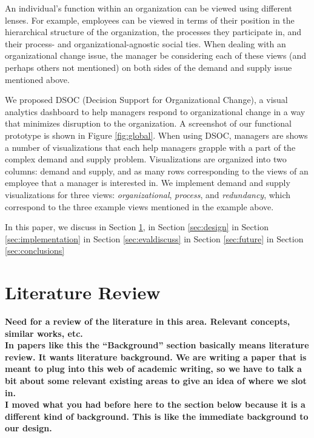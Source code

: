 \documentclass[journal]{vgtc}                %
\begin{document}
An individual's function within an organization can be viewed using different lenses. For example, employees can be viewed in terms of their position in the hierarchical structure of the organization, the processes they participate in, and their process- and organizational-agnostic social ties. When dealing with an organizational change issue, the manager be considering each of these views (and perhaps others not mentioned) on both sides of the demand and supply issue mentioned above.

We proposed DSOC (Decision Support for Organizational Change), a visual analytics dashboard to help managers respond to organizational change in a way that minimizes disruption to the organization. A screenshot of our functional prototype is shown in Figure \ref{fig:global}. When using DSOC, managers are shows a number of visualizations that each help managers grapple with a part of the complex demand and supply problem. Visualizations are organized into two columns: demand and supply, and as many rows corresponding to the views of an employee that a manager is interested in. We implement demand and supply visualizations for three views: \emph{organizational}, \emph{process}, and \emph{redundancy}, which correspond to the three example views mentioned in the example above. 

In this paper, we discuss \textellipsis in Section \ref{sec:background}, \textellipsis in Section \ref{sec:design} \textellipsis in Section \ref{sec:implementation} \textellipsis in Section \ref{sec:evaldiscuss} \textellipsis in Section \ref{sec:future} \textellipsis in Section \ref{sec:conclusions}


\section{Literature Review}
\label{sec:background}

\textbf{{\color{Plum}Need for a review of the literature in this area. Relevant concepts, similar works, etc.\\
    In papers like this the ``Background'' section basically means literature review. It wants literature background. We are writing a paper that is meant to plug into this web of academic writing, so we have to talk a bit about some relevant existing areas to give an idea of where we slot in. \\
    I moved what you had before here to the section below because it is a different kind of background. This is like the immediate background to our design. 
}}
\end{document}
